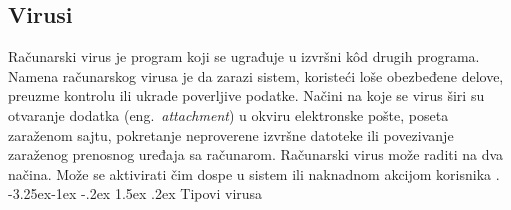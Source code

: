 \documentclass[a4paper]{article}
\makeatletter
\renewcommand\paragraph{\@startsection{paragraph}{4}{\z@}%
   {-3.25ex\@plus -1ex \@minus -.2ex}%
   {1.5ex \@plus .2ex}%
   {\normalfont\normalsize\bfseries}}
\makeatother
\begin{document}
\subsection{Virusi}

Računarski virus je program koji se ugrađuje u izvršni kôd drugih programa. Namena računarskog virusa je da zarazi sistem, koristeći loše obezbeđene delove, preuzme kontrolu ili ukrade poverljive podatke. Načini na koje se virus širi su otvaranje dodatka (eng.~{\em attachment}) u okviru elektronske pošte, poseta zaraženom sajtu, pokretanje neproverene izvršne datoteke ili povezivanje zaraženog prenosnog uređaja sa računarom. Računarski virus može raditi na dva načina. Može se aktivirati čim dospe u sistem ili naknadnom akcijom korisnika \cite{viruses_and_worms,computer_virus}.
\paragraph{Tipovi virusa}
\end{document}
